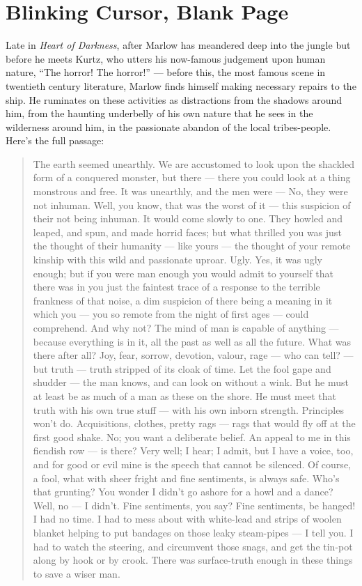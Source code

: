 \documentclass[letterpaper,oneside]{memoir}
\begin{document}
\section{Blinking Cursor, Blank Page}
  Late in \textit{Heart of Darkness}, after Marlow has meandered deep   into the jungle but before he meets Kurtz, who utters his now-famous   judgement upon human nature, ``The horror! The horror!'' --- before   this, the most famous scene in twentieth century literature, Marlow   finds himself making necessary repairs to the ship. He ruminates on   these activities as distractions from the shadows around him, from   the haunting underbelly of his own nature that he sees in the   wilderness around him, in the passionate abandon of the local   tribes-people.  Here's the full passage:
\begin{quotation}
  The earth seemed unearthly. We are accustomed to look upon the   shackled form of a conquered monster, but there --- there you could   look at a thing monstrous and free. It was unearthly, and the men   were --- No, they were not inhuman. Well, you know, that was the   worst of it --- this suspicion of their not being inhuman. It would   come slowly to one. They howled and leaped, and spun, and made   horrid faces; but what thrilled you was just the thought of their   humanity --- like yours --- the thought of your remote kinship with   this wild and passionate uproar. Ugly. Yes, it was ugly enough; but   if you were man enough you would admit to yourself that there was in   you just the faintest trace of a response to the terrible frankness   of that noise, a dim suspicion of there being a meaning in it which   you --- you so remote from the night of first ages --- could   comprehend. And why not?  The mind of man is capable of anything ---   because everything is in it, all the past as well as all the future. What was there after all?  Joy, fear, sorrow, devotion, valour, rage --- who can tell? --- but truth --- truth stripped of its cloak of time. Let the fool gape and shudder --- the man knows, and can look on without a wink. But he must at least be as much of a man as these on the shore. He must meet that truth with his own true stuff --- with his own inborn strength. Principles won't do. Acquisitions, clothes, pretty rags --- rags that would fly off at the first good shake. No; you want a deliberate belief. An appeal to me in this fiendish row --- is there? Very well; I hear; I admit, but I have a voice, too, and for good or evil mine is the speech that cannot be silenced. Of course, a fool, what with sheer fright and fine sentiments, is always safe. Who's that grunting? You wonder I didn't go ashore for a howl and a dance? Well, no --- I didn't. Fine sentiments, you say? Fine sentiments, be hanged! I had no time. I had to mess about with white-lead and strips of woolen blanket helping to put bandages on those leaky steam-pipes --- I tell you. I had to watch the steering, and circumvent those snags, and get the tin-pot along by hook or by crook. There was surface-truth enough in these things to save a wiser man.
\end{quotation}
\end{document}
